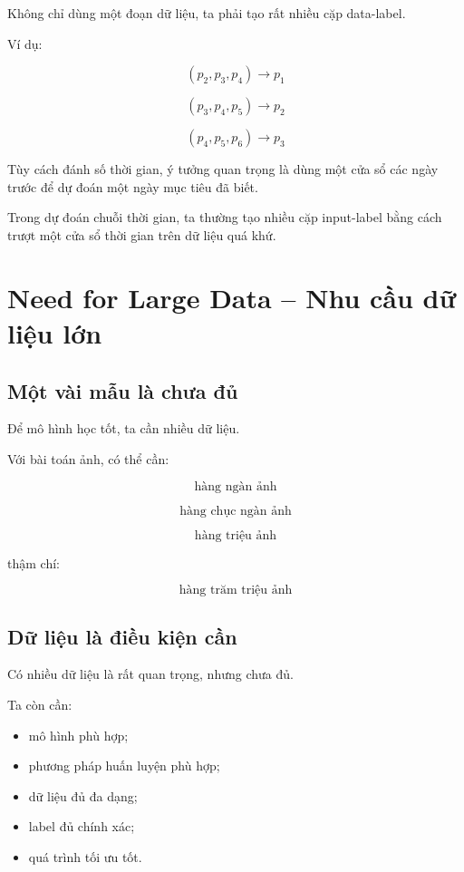 Không chỉ dùng một đoạn dữ liệu, ta phải tạo rất nhiều cặp data-label.

Ví dụ:

\[
    (p_2,p_3,p_4) \rightarrow p_1
\]

\[
    (p_3,p_4,p_5) \rightarrow p_2
\]

\[
    (p_4,p_5,p_6) \rightarrow p_3
\]

Tùy cách đánh số thời gian, ý tưởng quan trọng là dùng một cửa sổ các ngày trước để dự đoán một ngày mục tiêu đã biết.

\begin{ghinho}
Trong dự đoán chuỗi thời gian, ta thường tạo nhiều cặp input-label bằng cách trượt một cửa sổ thời gian trên dữ liệu quá khứ.
\end{ghinho}

\section{Need for Large Data -- Nhu cầu dữ liệu lớn}

\subsection{Một vài mẫu là chưa đủ}

Để mô hình học tốt, ta cần nhiều dữ liệu.

Với bài toán ảnh, có thể cần:

\[
    \text{hàng ngàn ảnh}
\]

\[
    \text{hàng chục ngàn ảnh}
\]

\[
    \text{hàng triệu ảnh}
\]

thậm chí:

\[
    \text{hàng trăm triệu ảnh}
\]

\subsection{Dữ liệu là điều kiện cần}

Có nhiều dữ liệu là rất quan trọng, nhưng chưa đủ.

Ta còn cần:

\begin{itemize}
    \item mô hình phù hợp;
    \item phương pháp huấn luyện phù hợp;
    \item dữ liệu đủ đa dạng;
    \item label đủ chính xác;
    \item quá trình tối ưu tốt.
\end{itemize}

